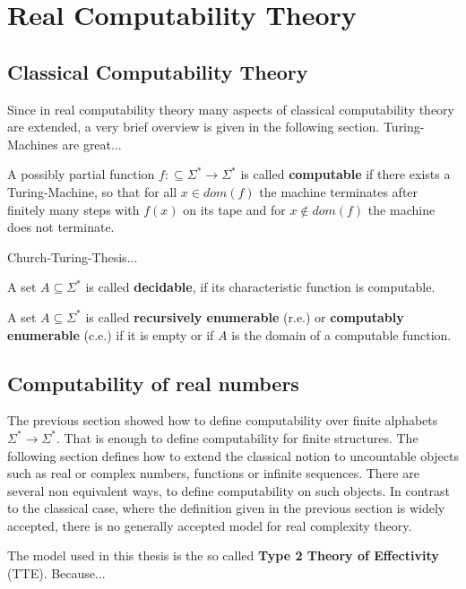\section{Real Computability Theory}\label{sec:real computability}
\subsection{Classical Computability Theory}
 Since in real computability theory many aspects of classical computability theory are extended, 
 a very brief overview is given in the following section.
 Turing-Machines are great...
 \begin{definition}
 	A possibly partial function $f:\subseteq \Sigma^* \to \Sigma^*$ is called \textbf{computable} if there exists 
 	a Turing-Machine, so that for all $x \in dom(f)$ the machine terminates after finitely many steps with $f(x)$ on its 
 	tape and for $x \not \in dom(f)$ the machine does not terminate.
 \end{definition}

 Church-Turing-Thesis...
 \begin{definition}
 	A set $A \subseteq \Sigma^*$ is called \textbf{decidable}, if its characteristic function is computable. 
 \end{definition}
 \begin{definition}
 	A set $A \subseteq \Sigma^*$ is called \textbf{recursively enumerable} (r.e.) or \textbf{computably enumerable} (c.e.) if 
 	it is empty or if $A$ is the domain of a computable function.   
 \end{definition}
\subsection{Computability of real numbers}
The previous section showed how to define computability over finite alphabets $\Sigma^* \to \Sigma^*$. 
That is enough to define computability for finite structures. The following section defines how to extend 
the classical notion to uncountable objects such as real or complex numbers, functions or infinite sequences.
There are several non equivalent ways, to define computability on such objects. 
In contrast to the classical case, where the definition given in the previous section is widely accepted, there is no 
generally accepted model for real complexity theory.

The model used in this thesis is the so called \textbf{Type 2 Theory of Effectivity} (TTE). 
Because... 

